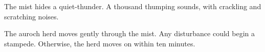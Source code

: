 \begin{boxtext}
  The mist hides a quiet-thunder.  A thousand thumping sounds, with crackling
  and scratching noises.
\end{boxtext}

\auroch

The auroch herd moves gently through the mist.
Any disturbance could begin a stampede.%
Otherwise, the herd moves on within ten minutes.
